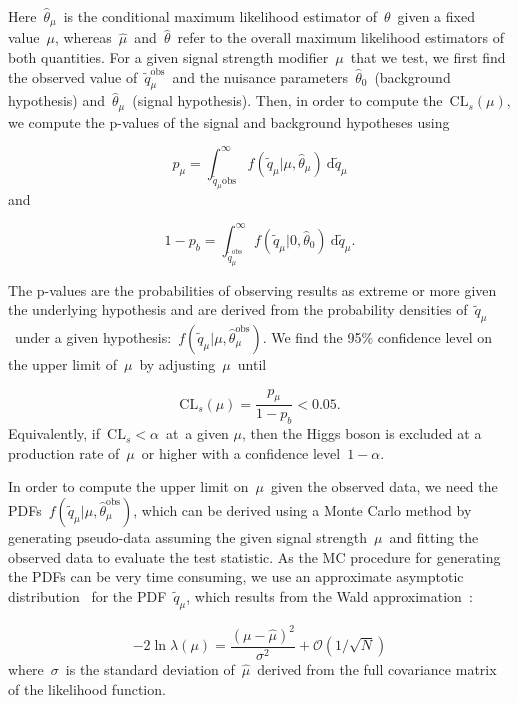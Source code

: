 Here~$\hat{\theta}_\mu$~is the conditional maximum likelihood estimator of~$\theta$~given a fixed value~$\mu$, whereas~$\hat{\mu}$~and~$\hat{\theta}$~refer to the overall maximum likelihood estimators of both quantities. For a given signal strength modifier~$\mu$~that we test, we first find the observed value of~$\tilde{q}_\mu^{\mathrm{obs}}$~and the nuisance parameters~$\hat{\theta}_0$~(background hypothesis) and~$\hat{\theta}_\mu$~(signal hypothesis). Then, in order to compute the~$\mathrm{CL}_s(\mu)$, we compute the p-values of the signal and background hypotheses using

\begin{equation}
p_{\mu} = \int_{\tilde{q}_{\mu}{\mathrm{obs}}}^\infty f(\tilde{q}_{\mu} | \mu, \hat{\theta}_{\mu})\ \mathrm{d}\tilde{q}_\mu
\end{equation}
and

\begin{equation}
1 - p_b = \int_{\tilde{q}_{\mu}^{\mathrm{obs}}}^\infty f(\tilde{q}_{\mu} | 0, \hat{\theta}_0)\ \mathrm{d}\tilde{q}_{\mu}.
\end{equation}

The p-values are the probabilities of observing results as extreme or more given the underlying hypothesis and are derived from the probability densities of~$\tilde{q}_{\mu}$~under a given hypothesis:~$f(\tilde{q}_\mu | \mu, \hat{\theta}_\mu^{\mathrm{obs}})$. We find the 95\% confidence level on the upper limit of~$\mu$~by adjusting~$\mu$~until

\begin{equation}
\mathrm{CL}_s(\mu) = \frac{p_\mu}{1 - p_b} < 0.05.
\end{equation}
Equivalently, if~$\mathrm{CL}_s < \alpha$~at~a given $\mu$, then the Higgs boson is excluded at a production rate of~$\mu$~or higher with a confidence level~$1 - \alpha$.

In order to compute the upper limit on~$\mu$~given the observed data, we need the PDFs~$f(\tilde{q}_\mu | \mu, \hat{\theta}_\mu^{\mathrm{obs}})$, which can be derived using a Monte Carlo method by generating pseudo-data assuming the given signal strength~$\mu$~and fitting the observed data to evaluate the test statistic. As the MC procedure for generating the PDFs can be very time consuming, we use an approximate asymptotic distribution~\cite{Cowan:2010js} for the PDF~$\tilde{q}_\mu$, which results from the Wald approximation~\cite{wald1943tests}:

\begin{equation}
-2 \ln{\lambda(\mu)} = \frac{(\mu - \hat{\mu})^2}{\sigma^2}+ \mathcal{O}(1/\sqrt{N})
\end{equation}
where~$\sigma$~is the standard deviation of~$\hat{\mu}$~derived from the full covariance matrix of the likelihood function.

